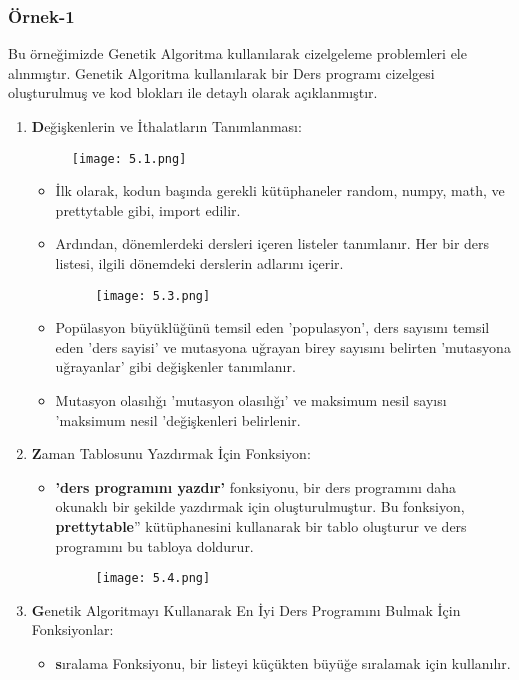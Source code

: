 \documentclass[12pt, a4paper]{article}
\begin{document}
\begin{flushleft}
\subsubsection{Örnek-1}
Bu örneğimizde  Genetik Algoritma kullanılarak  cizelgeleme problemleri ele alınmıştır. Genetik Algoritma kullanılarak  bir Ders programı cizelgesi oluşturulmuş ve kod blokları ile detaylı olarak  açıklanmıştır.\cite{Tobs80}

	\begin{enumerate}
	\item \textbf Değişkenlerin ve İthalatların Tanımlanması:
	
	\begin{figure}[!h]
		\centering
		\texttt{[image: 5.1.png]}
		\\[20pt]
	\end{figure}
	\begin{itemize}
		\item İlk olarak, kodun başında gerekli kütüphaneler random, numpy, math, ve prettytable gibi, import edilir.
		\item Ardından, dönemlerdeki dersleri içeren listeler  tanımlanır. Her bir ders listesi, ilgili dönemdeki derslerin adlarını içerir.
		
		\begin{figure}[!h]
			\centering
			\texttt{[image: 5.3.png]}
			\\[20pt]
		\end{figure}
		\item
		Popülasyon büyüklüğünü temsil eden 'populasyon', ders sayısını temsil eden 'ders sayisi' ve mutasyona uğrayan birey sayısını belirten 'mutasyona uğrayanlar' gibi değişkenler tanımlanır.
		\item Mutasyon olasılığı 'mutasyon olasılığı' ve maksimum nesil sayısı 'maksimum nesil 'değişkenleri belirlenir.
	\end{itemize}	
	\newpage
	
	\item \textbf Zaman Tablosunu Yazdırmak İçin Fonksiyon:
	\begin{itemize}
		\item \textbf{'ders programını yazdır'} fonksiyonu, bir ders programını daha okunaklı bir şekilde yazdırmak için oluşturulmuştur. Bu fonksiyon, \textbf{prettytable}'' kütüphanesini kullanarak bir tablo oluşturur ve ders programını bu tabloya doldurur.
		
		\begin{figure}[!h]
			\centering
			\texttt{[image: 5.4.png]}
			\\[5pt]
		\end{figure}
	\end{itemize}
	\item \textbf 	Genetik Algoritmayı Kullanarak En İyi Ders Programını Bulmak İçin Fonksiyonlar:
	\begin{itemize}
		\item \textbf sıralama Fonksiyonu, bir listeyi küçükten büyüğe sıralamak için kullanılır.
		

\end{itemize}
\end{enumerate}
\end{flushleft}
\end{document}
